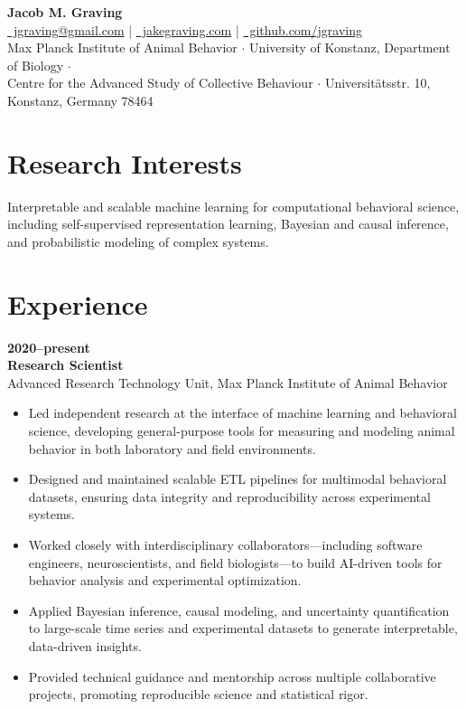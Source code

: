 \documentclass[10pt,letterpaper]{article}
\begin{document}
	
\begin{center}
	{\Huge \textbf{Jacob M. Graving}}\\[6pt]
	\href{mailto:jgraving@gmail.com}{\faEnvelope\ jgraving@gmail.com}
	\quad | \quad
	\href{http://jakegraving.com/}{\faGlobe\ jakegraving.com}
	\quad | \quad
	\href{https://github.com/jgraving}{\faGithub\ github.com/jgraving}\\[8pt]
	
	{\small
		Max Planck Institute of Animal Behavior \quad $\cdot$ \quad
		University of Konstanz, Department of Biology \quad $\cdot$ \quad \\
		Centre for the Advanced Study of Collective Behaviour \quad $\cdot$ \quad
		Universit\"{a}tsstr. 10, Konstanz, Germany 78464
	}
\end{center}

\section*{Research Interests}
Interpretable and scalable machine learning for computational behavioral science, including self-supervised representation learning, Bayesian and causal inference, and probabilistic modeling of complex systems.

	
	\section*{Experience}
	\textbf{2020--present}\\
	\textbf{Research Scientist}\\
	Advanced Research Technology Unit, Max Planck Institute of Animal Behavior
	\begin{itemize}
		\item Led independent research at the interface of machine learning and behavioral science, developing general-purpose tools for measuring and modeling animal behavior in both laboratory and field environments.
		\item Designed and maintained scalable ETL pipelines for multimodal behavioral datasets, ensuring data integrity and reproducibility across experimental systems.
		\item Worked closely with interdisciplinary collaborators—including software engineers, neuroscientists, and field biologists—to build AI-driven tools for behavior analysis and experimental optimization.
		\item Applied Bayesian inference, causal modeling, and uncertainty quantification to large-scale time series and experimental datasets to generate interpretable, data-driven insights.
		\item Provided technical guidance and mentorship across multiple collaborative projects, promoting reproducible science and statistical rigor.
	\end{itemize}
	
\end{document}
